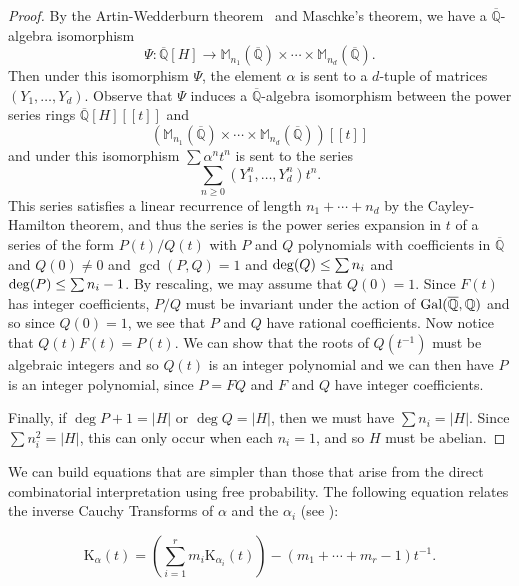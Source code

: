 \documentclass[11pt]{amsart}
\theoremstyle{definition}
\newcommand{\Q}{\mathbb{Q}}
\newcommand{\inv}[1]{#1^{-1}}
\newcommand{\invCT}{\mathrm{K}}
\newcommand{\Mat}{\mathbb{M}}
\begin{document}
\begin{proof} 
By the Artin-Wedderburn theorem~\cite{dummit} and Maschke's theorem, we have a $\overline{\mathbb{Q}}$-algebra isomorphism $$\Psi: \overline{\mathbb{Q}}[H] \to \Mat_{n_1}( \overline{\mathbb{Q}})\times \cdots \times \Mat_{n_d}( \overline{\mathbb{Q}}).$$   Then under this isomorphism $\Psi$, the element $\alpha$ is sent to a $d$-tuple of matrices $(Y_1,\ldots ,Y_d)$.  Observe that $\Psi$ induces a $\overline{\mathbb{Q}}$-algebra isomorphism
between the power series rings 
$ \overline{\mathbb{Q}}[H][[t]]$ and $$\left( \Mat_{n_1}( \overline{\mathbb{Q}})\times \cdots \times \Mat_{n_d}( \overline{\mathbb{Q}})\right)[[t]]$$ and under this isomorphism $\sum \alpha^n t^{n}$ is sent to
the series $$\sum_{n\ge 0} (Y_1^n,\ldots ,Y_d^n) t^{n}.$$  This series satisfies a linear recurrence of length
$n_1+\cdots +n_d$ by the Cayley-Hamilton theorem, and thus the series is the power series expansion in $t$ of a series of the form
$P(t)/Q(t)$ with $P$ and $Q$ polynomials with coefficients in $\overline{\Q}$ and $Q(0)\neq 0$ and $\gcd(P,Q)=1$ and ${\rm deg}(Q)\le \sum n_i$ and ${\rm deg}(P) \le \sum n_i -1$.  By rescaling, we may assume that $Q(0 )=1$.  Since $F(t)$ has integer coefficients, $P/Q$ must be invariant under the action of ${\rm Gal}(\overline{\mathbb{Q}},\mathbb{Q})$ and so since $Q(0)=1$, we see that $P$ and $Q$ have rational coefficients.  
Now notice that $Q(t) F(t) = P(t)$.  We can show that the roots of $Q(t^{-1})$ must be algebraic integers and so $Q(t)$ is an integer polynomial and we can then have $P$ is an integer polynomial, since $P=FQ$ and $F$ and $Q$ have integer coefficients. 

Finally, if $\deg P+1=|H|$ or $\deg Q=|H|$, then we must have $\sum n_i=|H|$.  Since $\sum n_i^2=|H|$, this can only occur when each $n_i=1$, and so $H$ must be abelian.
\end{proof}

We can build equations that are simpler than those that arise from the
direct combinatorial interpretation using free probability. The following equation relates the inverse Cauchy Transforms of ${\alpha}$ and the ${\alpha_i}$ (see \cite[Theorem 12.7]{FPcombs}): 

\begin{equation}\label{eq:free}
\invCT_{\alpha}(t) = \left(\sum_{i=1}^{r} m_i \invCT_{\alpha_i}(t)\right) - \left(m_1+\cdots +m_r-1\right) \inv{t}.
\end{equation}
\end{document}

